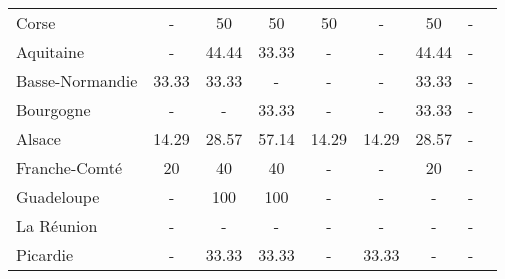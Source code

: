 \begin{table}[H]
\begin{tabularx}{\textwidth}{Xcccccccc}
            Corse & - & 50 & 50 & 50 & - & 50 & - \\
            Aquitaine & - & 44.44 & 33.33 & - & - & 44.44 & - \\
            Basse-Normandie  & 33.33 & 33.33 & - & - & - & 33.33 & - \\
            Bourgogne & - & - & 33.33 & - & - & 33.33 & - \\
            Alsace & 14.29 & 28.57 & 57.14 & 14.29 & 14.29 & 28.57 & - \\
            Franche-Comté & 20 & 40 & 40 & - & - & 20 & - \\
            Guadeloupe & - & 100 & 100 & - & - & - & - \\
            La Réunion  & - & - & - & - & - & - & - \\
            Picardie & - & 33.33 & 33.33 & - & 33.33 & - & - \\
        \bottomrule
    \end{tabularx}
\end{table}
    